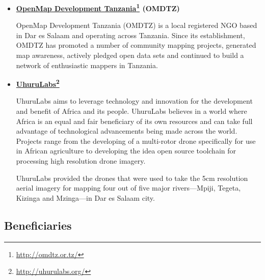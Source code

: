\documentclass[a4paper,12pt,twoside]{article}
\begin{document}
    \begin{itemize}
        \item \textbf{\href{http://omdtz.or.tz/}{OpenMap Development Tanzania}\footnote{\url{http://omdtz.or.tz/}} (OMDTZ)} %
        
        OpenMap Development Tanzania (OMDTZ) is a local registered NGO based in Dar es Salaam and operating across Tanzania. Since its establishment, OMDTZ has promoted a number of community mapping projects, generated map awareness, actively pledged open data sets and continued to build a network of enthusiastic mappers in Tanzania.
    
        \item \textbf{\href{http://uhurulabs.org/}{UhuruLabs}\footnote{\url{http://uhurulabs.org/}}}
    
        UhuruLabs aims to leverage technology and innovation for the development and benefit of Africa and its people. UhuruLabs believes in a world where Africa is an equal and fair beneficiary of its own resources and can take full advantage of technological advancements being made across the world. Projects range from the developing of a multi-rotor drone specifically for use in African agriculture to developing the idea open source toolchain for processing high resolution drone imagery. 
    
        UhuruLabs provided the drones that were used to take the 5cm resolution aerial imagery for mapping four out of five major rivers---Mpiji, Tegeta, Kizinga and Mzinga---in Dar es Salaam city. %
    
    \end{itemize}

\subsection{Beneficiaries}
\end{document}
